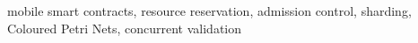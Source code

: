 \begin{IEEEkeywords}
mobile smart contracts, resource reservation, admission control, sharding,
Coloured Petri Nets, concurrent validation
\end{IEEEkeywords}
